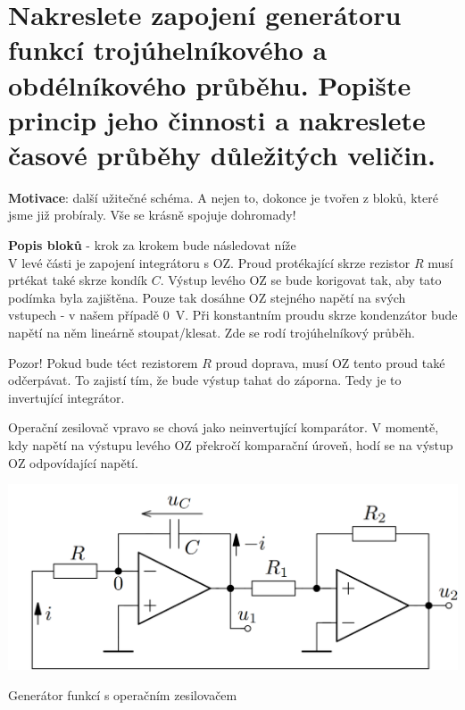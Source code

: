 \documentclass[a4paper,12pt]{article}   %
\begin{document}
\section{Nakreslete zapojení generátoru funkcí {trojúhelníkového a obdélníkového průběhu}. Popište princip jeho činnosti a nakreslete časové průběhy důležitých veličin.}

\textbf{Motivace}: další užitečné schéma. A nejen to, dokonce je tvořen z bloků, které jsme již probíraly. Vše se krásně spojuje dohromady!

\textbf{Popis bloků }- krok za krokem bude následovat níže\\
V levé části je zapojení integrátoru s OZ. Proud protékající skrze rezistor $R$ musí prtékat také skrze kondík $C$. Výstup levého OZ se bude korigovat tak, aby tato podímka byla zajištěna. Pouze tak dosáhne OZ stejného napětí na svých vstupech - v našem případě 0~V. Při konstantním proudu skrze kondenzátor bude napětí na něm lineárně stoupat/klesat. Zde se rodí trojúhelníkový průběh.

Pozor! Pokud bude téct rezistorem $R$ proud doprava, musí OZ tento proud také odčerpávat. To zajistí tím, že bude výstup tahat do záporna. Tedy je to invertující integrátor.

Operační zesilovač vpravo se chová jako neinvertující komparátor. V momentě, kdy napětí na výstupu levého OZ překročí komparační úroveň, hodí se na výstup OZ odpovídající napětí.
\begin{schema}[h!]
    \centering
    \includegraphics[width=.7\textwidth]{gen_funct.PNG}
    \caption{Generátor funkcí s operačním zesilovačem}
    \label{sch:gen:fci}
\end{schema}
\end{document}
